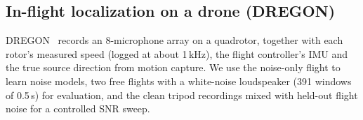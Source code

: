 \subsection{In-flight localization on a drone (DREGON)}
\label{sec:case-dregon}

DREGON~\cite{strauss2018dregon} records an 8-microphone array on a quadrotor, together with each rotor's measured speed (logged at about 1\,kHz), the flight controller's IMU and the true source direction from motion capture.
We use the noise-only flight to learn noise models, two free flights with a white-noise loudspeaker (391 windows of 0.5\,s) for evaluation, and the clean tripod recordings mixed with held-out flight noise for a controlled SNR sweep.

